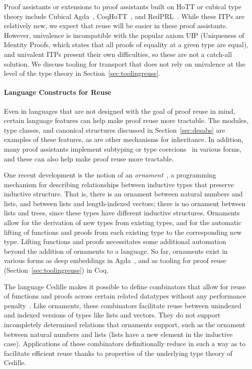 Proof assistants or extensions to proof assistants built on HoTT or cubical type theory
include Cubical Agda~\citep{cubical-agda}, CoqHoTT~\citep{coq-hott}, and RedPRL~\citep{redprl}.
While these ITPs are relatively new,
we expect that reuse will be easier in these proof assistants.
However, univalence is incompatible with the popular axiom UIP (Uniqueness of Identity Proofs, which states
that all proofs of equality at a given type are equal),
and univalent ITPs present their own difficulties,
so these are not a catch-all solution.
We discuss tooling for transport that does not rely on univalence
at the level of the type theory in Section~\ref{sec:toolingreuse}.

\paragraph{Language Constructs for Reuse}
Even in languages that are not designed with the goal of proof reuse in mind, certain language features can help make proof reuse more tractable.
The modules, type classes, and canonical structures discussed in Section~\ref{sec:desabs} are examples of these features, as are
other mechanisms for inheritance.
In addition, many proof assistants implement subtyping or type
coercions~\citep{barthe1995implicit, aspinall1996subtyping, Saibi1997, luo1999coercive, asperti2007user, callaghan2001implementation, deMoura2015} in various forms,
and these can also help make proof reuse more tractable.

One recent development is the notion of an \textit{ornament}~\citep{mcbride2010}, a programming mechanism for describing relationships
between inductive types that preserve inductive structure. That is, there is an ornament between natural numbers
and lists, and between lists and length-indexed vectors; there is no ornament
between lists and trees, since these types have different inductive structures.
Ornaments allow for the derivation of new types from existing types, and for the automatic lifting of functions and proofs
from each existing type to the corresponding new type. Lifting functions and proofs necessitates some additional automation beyond
the addition of ornaments to a language.
So far, ornaments exist in various forms as deep embeddings in Agda~\citep{Dagand17jfp, Williams2014, ko2016},
and as tooling for proof reuse (Section~\ref{sec:toolingreuse}) in Coq.

The language Cedille makes it possible to define combinators that allow for reuse of functions and proofs
across certain related datatypes without any performance penalty~\citep{Diehl2018}.
Like ornaments, these combinators facilitate reuse between unindexed and indexed versions of types
like lists and vectors. They do not support incompletely determined relations that ornaments support,
such as the ornament between natural numbers and lists (lists have a new element in the inductive case).
Applications of these combinators definitionally reduce in such a way as to facilitate efficient reuse thanks to properties
of the underlying type theory of Cedille.


